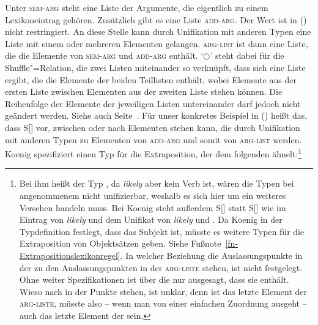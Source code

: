 \label{koenig-likely}
\z
Unter \textsc{sem-arg} steht eine Liste der Argumente, die eigentlich zu einem
Lexikoneintrag gehören. Zusätzlich gibt es eine Liste \textsc{add-arg}. Der Wert
ist in () nicht restringiert. An diese Stelle kann durch Unifikation mit
anderen Typen eine Liste mit einem oder mehreren Elementen gelangen. \textsc{arg-list}
ist dann eine Liste, die die Elemente von \textsc{sem-arg} und \textsc{add-arg} enthält.
`$\bigcirc$'\is{$\bigcirc$}
steht dabei für die Shuffle"=Relation, die zwei Listen miteinander so
verknüpft, dass sich eine Liste ergibt, die die Elemente der beiden Teillisten enthält,
wobei Elemente aus der ersten Liste zwischen Elementen aus der zweiten Liste stehen können.
Die Reihenfolge der Elemente der jeweiligen Listen untereinander darf jedoch nicht geändert
werden. Siehe auch Seite~\pageref{rel-shuffle}. Für unser konkretes Beispiel in
() heißt das, dass S[] vor, zwischen oder nach Elementen stehen kann,
die durch Unifikation mit anderen Typen zu Elementen von \textsc{add-arg} und somit
von \textsc{arg-list} werden. Koenig spezifiziert einen Typ für die Extraposition,
der dem folgenden ähnelt:\footnote{
  Bei ihm heißt der Typ , da \emph{likely} aber kein Verb ist,
  wären die Typen bei angenommenem \headw {} nicht unifizierbar, weshalb es sich hier um ein weiteres
  Versehen handeln muss. Bei Koenig steht außerdem S[] statt S[]
  wie im Eintrag von \emph{likely} und dem Unifikat von \emph{likely} und . Da
  Koenig in der Typdefinition festlegt, dass  das Subjekt ist, müsste es weitere Typen für
  die Extraposition von Objektsätzen geben. Siehe Fußnote~\ref{fn-Extrapositionslexikonregel}. In
  welcher Beziehung die Auslassungspunkte in der \compsl zu den Auslassungspunkten in der
  \textsc{arg-liste} stehen, ist nicht festgelegt. Ohne weiter Spezifikationen ist über die \compsl
  nur ausgesagt, dass sie  enthält. Wieso nach  in der \compsl Punkte stehen, ist unklar, denn  ist das letzte Element der
  \textsc{arg-liste}, müsste also -- wenn man von einer einfachen Zuordnung ausgeht -- auch das letzte Element der \compsl sein. %
}
